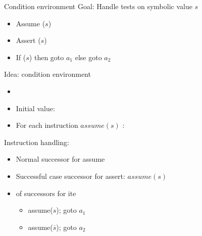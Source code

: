\begin{frame}{Condition environment}
      Goal: Handle tests on symbolic value $s$
      \begin{small}
      \begin{itemize}
      \item Assume ($s$)
      \item Assert ($s$)
      \item If ($s$) then goto $a_1$ else goto $a_2$
      \end{itemize}
      \end{small}
      \bigskip
      Idea: condition environment
      \begin{itemize}
      \item {\color{red}{$\condenv$: formula over regions}}
      \item Initial value: {\color{red}{$\condenv := true$}}
      \item For each instruction $assume(s)$ : {\color{red}{$\condenv := \condenv \wedge s$}}
      \end{itemize}
      \bigskip
      Instruction handling: 
      \begin{itemize}
      \item Normal successor for assume
      \item Successful case successor for assert: $assume(s)$
      \item {\color{red}{Non deterministic choice}} of successors for ite
      \begin{itemize}
      \item assume($s$); goto $a_1$ 
      \item assume($\overline{s}$); goto $a_2$
      \end{itemize}
      \end{itemize}
\end{frame}



